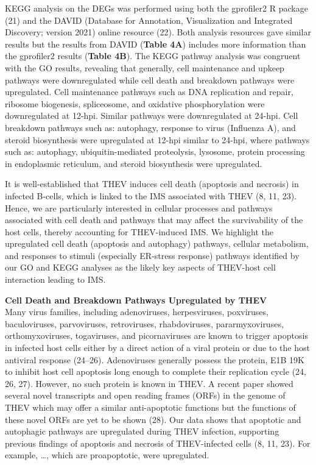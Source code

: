 \documentclass[
]{article}
\begin{document}
KEGG analysis on the DEGs was performed using both the gprofiler2 R
package (21) and the DAVID (Database for Annotation, Visualization and
Integrated Discovery; version 2021) online resource (22). Both analysis
resources gave similar results but the results from DAVID (\textbf{Table
4A}) includes more information than the gprofiler2 results
(\textbf{Table 4B}). The KEGG pathway analysis was congruent with the GO
results, revealing that generally, cell maintenance and upkeep pathways
were downregulated while cell death and breakdown pathways were
upregulated. Cell maintenance pathways such as DNA replication and
repair, ribosome biogenesis, spliceosome, and oxidative phosphorylation
were downregulated at 12-hpi. Similar pathways were downregulated at
24-hpi. Cell breakdown pathways such as: autophagy, response to virus
(Influenza A), and steroid biosynthesis were upregulated at 12-hpi
similar to 24-hpi, where pathways such as: autophagy, ubiquitin-mediated
proteolysis, lysosome, protein processing in endoplasmic reticulum, and
steroid biosynthesis were upregulated.

It is well-established that THEV induces cell death (apoptosis and
necrosis) in infected B-cells, which is linked to the IMS associated
with THEV (8, 11, 23). Hence, we are particularly interested in cellular
processes and pathways associated with cell death and pathways that may
affect the survivability of the host cells, thereby accounting for
THEV-induced IMS. We highlight the upregulated cell death (apoptosis and
autophagy) pathways, cellular metabolism, and responses to stimuli
(especially ER-stress response) pathways identified by our GO and KEGG
analyses as the likely key aspects of THEV-host cell interaction leading
to IMS.

\textbf{Cell Death and Breakdown Pathways Upregulated by THEV}\\
Many virus families, including adenoviruses, herpesviruses, poxviruses,
baculoviruses, parvoviruses, retroviruses, rhabdoviruses,
pararmyxoviruses, orthomyxoviruses, togaviruses, and picornaviruses are
known to trigger apoptosis in infected host cells either by a direct
action of a viral protein or due to the host antiviral response
(24--26). Adenoviruses generally possess the protein, E1B 19K to inhibit
host cell apoptosis long enough to complete their replication cycle (24,
26, 27). However, no such protein is known in THEV. A recent paper
showed several novel transcripts and open reading frames (ORFs) in the
genome of THEV which may offer a similar anti-apoptotic functions but
the functions of these novel ORFs are yet to be shown (28). Our data
shows that apoptotic and autophagic pathways are upregulated during THEV
infection, supporting previous findings of apoptosis and necrosis of
THEV-infected cells (8, 11, 23). For example, \ldots, which are
proapoptotic, were upregulated.
\end{document}
